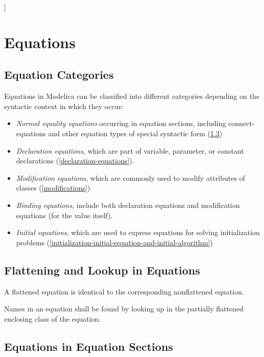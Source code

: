 \documentclass[10pt,a4paper]{report}
\def\doublelabel#1{\label{#1}\hypertarget{#1}{}}
\begin{document}
{]}

\chapter{Equations}\doublelabel{equations}

\section{Equation Categories}\doublelabel{equation-categories}

Equations in Modelica can be classified into different categories
depending on the syntactic context in which they occur:

\begin{itemize}
\item
  \emph{Normal equality equations} occurring in equation sections,
  including connect-equations and other equation types of special
  syntactic form (\ref{equations-in-equation-sections})
\item
  \emph{Declaration equations}, which are part of variable, parameter,
  or constant declarations (\ref{declaration-equations}).
\item
  \emph{Modification equations}, which are commonly used to modify
  attributes of classes (\ref{modifications})
\item
  \emph{Binding equations,} include both declaration equations and
  modification equations (for the value itself).
\item
  \emph{Initial equations}, which are used to express equations for
  solving initialization problems (\ref{initialization-initial-equation-and-initial-algorithm})
\end{itemize}

\section{Flattening and Lookup in Equations}\doublelabel{flattening-and-lookup-in-equations}

A flattened equation is identical to the corresponding nonflattened
equation.

Names in an equation shall be found by looking up in the partially
flattened enclosing class of the equation.

\section{Equations in Equation Sections}\doublelabel{equations-in-equation-sections}
\end{document}
